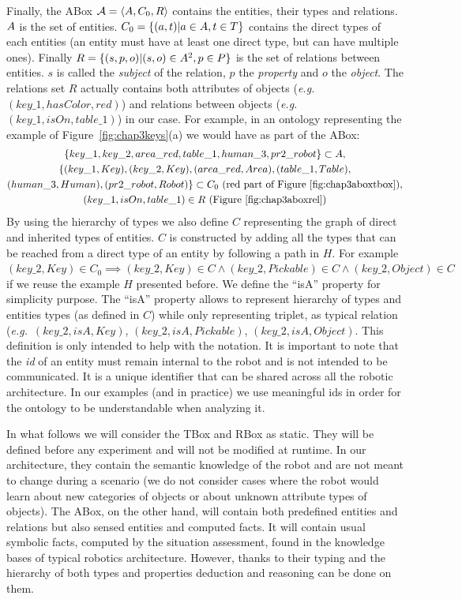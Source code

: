 \documentclass[a4paper,11pt,twoside]{StyleThese}
\begin{document}
Finally, the ABox $\mathcal{A} = \langle A, C_0, R \rangle$ contains the entities, their types and relations. $A$ is the set of entities. $C_0 = \{(a, t)|a \in A, t \in T\}$ contains the direct types of each entities (an entity must have at least one direct type, but can have multiple ones). Finally $R = \{(s, p, o)|(s, o) \in A^2, p \in P\}$ is the set of relations between entities. $s$ is called the \textit{subject} of the relation, $p$ the \textit{property} and $o$ the \textit{object}. The relations set $R$ actually contains both attributes of objects (\textit{e.g.}~$(key\_1, hasColor, red)$) and relations between objects (\textit{e.g.}~$(key\_1, isOn, table\_1)$) in our case. For example, in an ontology representing the example of Figure~\ref{fig:chap3keys}(a) we would have as part of the ABox: 
\begin{multline*}
\{key\_1, key\_2, area\_red, table\_1, human\_3, pr2\_robot\} \subset A,\\
\{(key\_1, Key), (key\_2, Key), (area\_red, Area), (table\_1, Table),\\
(human\_3, Human), (pr2\_robot, Robot)\} \subset C_0 \text{ (red part of Figure~\ref{fig:chap3aboxtbox})},\\
(key\_1, isOn, table\_1) \in R \text{ (Figure~\ref{fig:chap3aboxrel})}
\end{multline*}
By using the hierarchy of types we also define $C$ representing the graph of direct and inherited types of entities. $C$ is constructed by adding all the types that can be reached from a direct type of an entity by following a path in $H$. For example $(key\_2, Key) \in C_0 \implies (key\_2, Key) \in C \land (key\_2, Pickable) \in C \land (key\_2, Object) \in C$ if we reuse the example $H$ presented before.
We define the ``isA'' property for simplicity purpose. The ``isA'' property allows to represent hierarchy of types and entities types (as defined in $C$) while only representing triplet, as typical relation (\textit{e.g.}~$(key\_2, isA, Key)$, $(key\_2, isA, Pickable)$, $(key\_2, isA, Object)$. This definition is only intended to help with the notation.
It is important to note that the \textit{id} of an entity must remain internal to the robot and is not intended to be communicated. It is a unique identifier that can be shared across all the robotic architecture. In our examples (and in practice) we use meaningful ids in order for the ontology to be understandable when analyzing it.

In what follows we will consider the TBox and RBox as static. They will be defined before any experiment and will not be modified at runtime. In our architecture, they contain the semantic knowledge of the robot and are not meant to change during a scenario (we do not consider cases where the robot would learn about new categories of objects or about unknown attribute types of objects). The ABox, on the other hand, will contain both predefined entities and relations but also sensed entities and computed facts. It will contain usual symbolic facts, computed by the situation assessment, found in the knowledge bases of typical robotics architecture. However, thanks to their typing and the hierarchy of both types and properties deduction and reasoning can be done on them.
\end{document}
